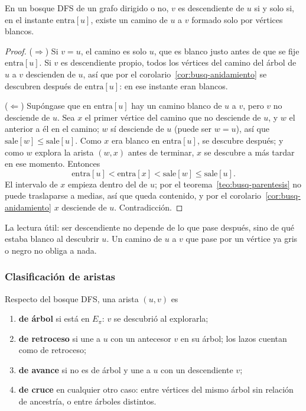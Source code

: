 \documentclass[11pt,letterpaper]{article}
\begin{document}
\begin{teorema}
  \label{teo:busq-camino-blanco}
  En un bosque DFS de un grafo dirigido o no, $v$ es descendiente de
  $u$ si y solo si, en el instante $\text{entra}[u]$, existe un camino
  de $u$ a $v$ formado solo por vértices blancos.
\end{teorema}

\begin{proof}
  ($\Rightarrow$) Si $v = u$, el camino es solo $u$, que es blanco
  justo antes de que se fije $\text{entra}[u]$. Si $v$ es descendiente
  propio, todos los vértices del camino del árbol de $u$ a $v$
  descienden de $u$, así que por el
  corolario~\ref{cor:busq-anidamiento} se descubren después de
  $\text{entra}[u]$: en ese instante eran blancos.

  ($\Leftarrow$) Supóngase que en $\text{entra}[u]$ hay un camino
  blanco de $u$ a $v$, pero $v$ no desciende de $u$. Sea $x$ el primer
  vértice del camino que no desciende de $u$, y $w$ el anterior a él
  en el camino; $w$ sí desciende de $u$ (puede ser $w = u$), así que
  $\text{sale}[w] \leq \text{sale}[u]$. Como $x$ era blanco en
  $\text{entra}[u]$, se descubre después; y como $w$ explora la arista
  $(w, x)$ antes de terminar, $x$ se descubre a más tardar en ese
  momento. Entonces
  \[
    \text{entra}[u] < \text{entra}[x] < \text{sale}[w] \leq
    \text{sale}[u] .
  \]
  El intervalo de $x$ empieza dentro del de $u$; por el
  teorema~\ref{teo:busq-parentesis} no puede traslaparse a medias, así
  que queda contenido, y por el corolario~\ref{cor:busq-anidamiento}
  $x$ desciende de $u$. Contradicción.
\end{proof}

La lectura útil: ser descendiente no depende de lo que pase después,
sino de qué estaba blanco al descubrir $u$. Un camino de $u$ a $v$ que
pase por un vértice ya gris o negro no obliga a nada.

\subsubsection*{Clasificación de aristas}

\begin{definicion}
  Respecto del bosque DFS, una arista $(u, v)$ es
  \begin{enumerate}[itemsep=0.1em]
    \item \textbf{de árbol} si está en $E_\pi$: $v$ se descubrió al
      explorarla;
    \item \textbf{de retroceso} si une a $u$ con un antecesor $v$ en
      su árbol; los lazos cuentan como de retroceso;
    \item \textbf{de avance} si no es de árbol y une a $u$ con un
      descendiente $v$;
    \item \textbf{de cruce} en cualquier otro caso: entre vértices del
      mismo árbol sin relación de ancestría, o entre árboles
      distintos.
  \end{enumerate}
\end{definicion}
\end{document}
